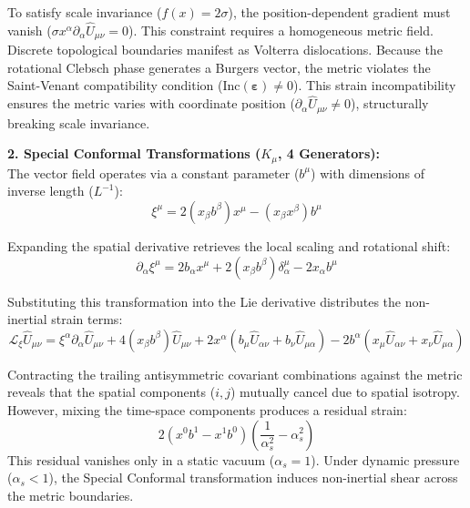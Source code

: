 To satisfy scale invariance ($f(x) = 2\sigma$), the position-dependent gradient must vanish ($\sigma x^\alpha \partial_\alpha \hat{U}_{\mu\nu} = 0$). This constraint requires a homogeneous metric field. Discrete topological boundaries manifest as Volterra dislocations. Because the rotational Clebsch phase generates a Burgers vector, the metric violates the Saint-Venant compatibility condition ($\text{Inc}(\boldsymbol{\varepsilon}) \neq 0$). This strain incompatibility ensures the metric varies with coordinate position ($\partial_\alpha \hat{U}_{\mu\nu} \neq 0$), structurally breaking scale invariance. 
\vspace{0.2 cm}

\textbf{2. Special Conformal Transformations ($K_\mu$, 4 Generators):} \\
The vector field operates via a constant parameter ($b^\mu$) with dimensions of inverse length ($L^{-1}$):
\begin{equation}
    \xi^\mu = 2(x_\beta b^\beta)x^\mu - (x_\beta x^\beta)b^\mu
\end{equation}

Expanding the spatial derivative retrieves the local scaling and rotational shift:
\begin{equation}
    \partial_\alpha \xi^\mu = 2 b_\alpha x^\mu + 2(x_\beta b^\beta)\delta^\mu_\alpha - 2x_\alpha b^\mu
\end{equation}

Substituting this transformation into the Lie derivative distributes the non-inertial strain terms:
\begin{equation}
    \mathcal{L}_\xi \hat{U}_{\mu\nu} = \xi^\alpha \partial_\alpha \hat{U}_{\mu\nu} + 4(x_\beta b^\beta)\hat{U}_{\mu\nu} + 2x^\alpha(b_\mu \hat{U}_{\alpha\nu} + b_\nu \hat{U}_{\mu\alpha}) - 2b^\alpha(x_\mu \hat{U}_{\alpha\nu} + x_\nu \hat{U}_{\mu\alpha})
\end{equation}

Contracting the trailing antisymmetric covariant combinations against the metric reveals that the spatial components ($i, j$) mutually cancel due to spatial isotropy. However, mixing the time-space components produces a residual strain: 
\begin{equation}
    2(x^0 b^1 - x^1 b^0) \left( \frac{1}{\alpha_s^2} - \alpha_s^2 \right)
\end{equation}
This residual vanishes only in a static vacuum ($\alpha_s = 1$). Under dynamic pressure ($\alpha_s < 1$), the Special Conformal transformation induces non-inertial shear across the metric boundaries.

